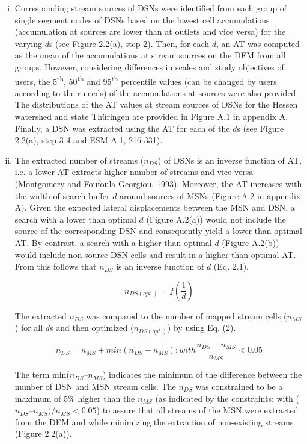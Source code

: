 \begin{enumerate}[(i)]
\item Corresponding stream sources of DSNs were identified from each group of single segment nodes of DSNs based on the lowest cell accumulations (accumulation at sources are lower than at outlets and vice versa) for the varying $d$s (see Figure 2.2(a), step 2). Then, for each $d$, an AT was computed as the mean of the accumulations at stream sources on the DEM from all groups. However, considering differences in scales and study objectives of users, the 5\textsuperscript{th}, 50\textsuperscript{th} and 95\textsuperscript{th} percentile values (can be changed by users according to their needs) of the accumulations at sources were also provided. The distributions of the AT values at stream sources of DSNs for the Hessen watershed and state Thüringen are provided in Figure A.1 in appendix A. Finally, a DSN was extracted using the AT for each of the $d$s (see Figure 2.2(a), step 3-4 and ESM A.1, 216-331).

\item The extracted number of streams ($n_{DS}$) of DSNs is an inverse function of AT, i.e. a lower AT extracts higher number of streams and vice-versa (Montgomery and Foufoula-Georgiou, 1993). Moreover, the AT increases with the width of search buffer $d$ around sources of MSNs (Figure A.2 in appendix A). Given the expected lateral displacements between the MSN and DSN, a search with a lower than optimal $d$ (Figure A.2(a)) would not include the source of the corresponding DSN and consequently yield a lower than optimal AT. By contrast, a search with a higher than optimal $d$ (Figure A.2(b)) would include non-source DSN cells and result in a higher than optimal AT. From this follows that $n_{DS}$ is an inverse function of $d$ (Eq. 2.1).

\begin{equation}
n_{DS(opt.)}=f(\frac{1}{d})
\label{Eq. 2.1}
\end{equation}

The extracted $n_{DS}$ was compared to the number of mapped stream cells ($n_{MS}$) for all $d$s and then optimized ($n_{DS(opt.)}$) by using Eq. (2).

\begin{equation}
n_{DS}=n_{MS}+min(n_{DS}-n_{MS});with\frac{n_{DS}-n_{MS}}{n_{MS}}<0.05
\label{Eq. 1.1}
\end{equation}

The term min($n_{DS} – n_{MS}$) indicates the minimum of the difference between the number of DSN and MSN stream cells. The $n_{DS}$ was constrained to be a maximum of 5\% higher than the $n_{MS}$ (as indicated by the constraints: with ($n_{DS} – n_{MS})/n_{MS}<0.05$) to assure that all streams of the MSN were extracted from the DEM and while minimizing the extraction of non-existing streams (Figure 2.2(a)).

\end{enumerate}

